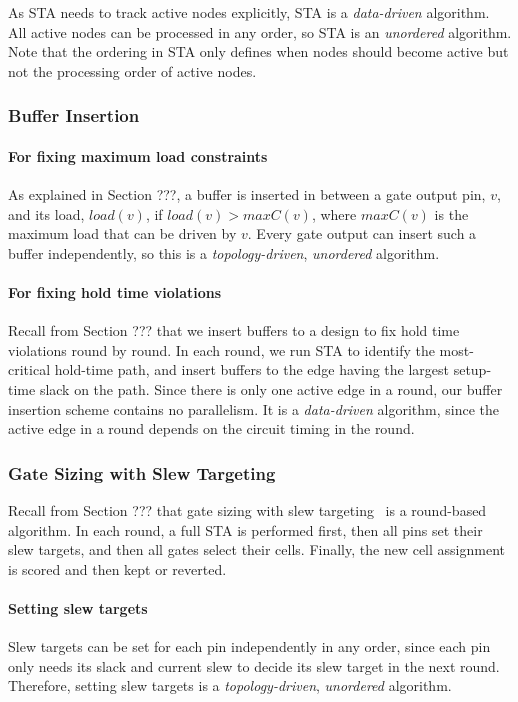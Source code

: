 As STA needs to track active nodes explicitly, STA is a {\em data-driven} algorithm. All active nodes can be processed in any order, so STA is an {\em unordered} algorithm. Note that the ordering in STA only defines when nodes should become active but not the processing order of active nodes.

\subsubsection{Buffer Insertion}

\paragraph{For fixing maximum load constraints} As explained in Section ???, a buffer is inserted in between a gate output pin, $v$, and its load, $load(v)$, if $load(v) > maxC(v)$, where $maxC(v)$ is the maximum load that can be driven by $v$.
Every gate output can insert such a buffer independently, so this is a {\em topology-driven}, {\em unordered} algorithm.

\paragraph{For fixing hold time violations} Recall from Section ??? that we insert buffers to a design to fix hold time violations round by round. In each round, we run STA to identify the most-critical hold-time path, and insert buffers to the edge having the largest setup-time slack on the path. Since there is only one active edge in a round, our buffer insertion scheme contains no parallelism. It is a {\em data-driven} algorithm, since the active edge in a round depends on the circuit timing in the round.

\subsubsection{Gate Sizing with Slew Targeting}

Recall from Section ??? that gate sizing with slew targeting~\cite{Held:Gate} is a round-based algorithm. In each round, a full STA is performed first, then all pins set their slew targets, and then all gates select their cells. Finally, the new cell assignment is scored and then kept or reverted.

\paragraph{Setting slew targets} Slew targets can be set for each pin independently in any order, since each pin only needs its slack and current slew to decide its slew target in the next round. Therefore, setting slew targets is a {\em topology-driven}, {\em unordered} algorithm.

